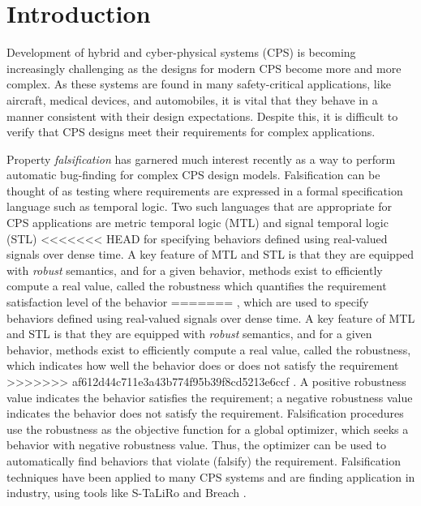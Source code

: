 \section{Introduction} \label{sec:introduction}

Development of hybrid and cyber-physical systems (CPS) is becoming
increasingly challenging as the designs for modern CPS become more and
more complex.  As these systems are found in many safety-critical
applications, like aircraft, medical devices, and automobiles, it is
vital that they behave in a manner consistent with their
design expectations. Despite this, it is difficult to verify that CPS
designs meet their requirements for complex applications.


Property \emph{falsification} has garnered much interest recently as a
way to perform automatic bug-finding for complex CPS design
models. Falsification can be thought of as testing where requirements are expressed 
in a formal specification language such as temporal logic.
Two such
languages that are appropriate for CPS applications are metric
temporal logic (MTL) and signal temporal logic (STL)
<<<<<<< HEAD
\cite{Koymans1990,MalerN04} for specifying behaviors defined
using real-valued signals over dense time. A key feature of MTL and
STL is that they are equipped with \emph{robust} semantics, and for a given behavior, methods exist to efficiently compute a
real value, called the robustness which quantifies the requirement satisfaction level of the behavior
=======
\cite{Koymans1990,MalerN04}, which are used to specify behaviors defined
using real-valued signals over dense time. A key feature of MTL and
STL is that they are equipped with \emph{robust} semantics, and for a given behavior, methods exist to efficiently compute a
real value, called the robustness, which indicates how well the
behavior does or does not satisfy the requirement
>>>>>>> af612d44c711e3a43b774f95b39f8cd5213e6ccf
\cite{FainekosP06fates,DonzeM10}. A positive robustness value
indicates the behavior satisfies the requirement; a negative
robustness value indicates the behavior does not satisfy the
requirement. Falsification procedures use the robustness as the objective function
for a global optimizer, which seeks a
behavior with negative robustness value. Thus, the optimizer can
be used to automatically find behaviors that violate (falsify) the
requirement. Falsification techniques have been applied to many CPS
systems and are finding application in industry, using tools like
S-TaLiRo and Breach \cite{TaliroLFS11,BreachCAV10}. 

